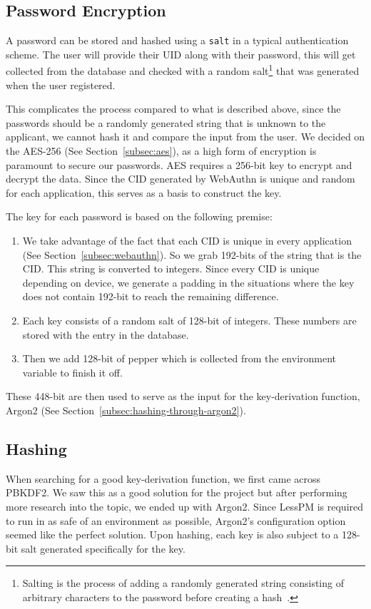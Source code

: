 \subsection{Password Encryption}\label{subsec:password-encryption}
A password can be stored and hashed using a \texttt{salt} in a typical
authentication scheme.
The user will provide their UID along with their password, this will get
collected from the database and checked with a random salt\footnote{
  Salting is the process of adding a randomly generated string consisting of
  arbitrary characters to the password before creating a hash~\cite{
    Kharod2015}.
} that was generated when the user registered.

This complicates the process compared to what is described above, since
the passwords should be a randomly generated string that is unknown to the
applicant, we cannot hash it and compare the input from the user.
We decided on the AES-256 (See Section~\ref{subsec:aes}), as a high form of
encryption is paramount to secure our passwords.
AES requires a 256-bit key to encrypt and decrypt the data.
Since the CID generated by WebAuthn is unique and random for each application,
this serves as a basis to construct the key.

The key for each password is based on the following premise:
\begin{enumerate}
  \item
  We take advantage of the fact that each CID is unique in every
  application (See Section~\ref{subsec:webauthn}). So we grab 192-bits of the
  string that is the CID\@.
  This string is converted to integers.
  Since every CID is unique depending on device, we generate a padding in the
  situations where the key does not contain 192-bit to reach the remaining
  difference.
  \item
  Each key consists of a random salt of 128-bit of integers.
  These numbers are stored with the entry in the database.
  \item
  Then we add 128-bit of pepper which is collected from the environment
  variable to finish it off.
\end{enumerate}
These 448-bit are then used to serve as the input for the key-derivation
function, Argon2 (See Section~\ref{subsec:hashing-through-argon2}).

\subsection{Hashing}\label{subsec:hashing}
When searching for a good key-derivation function, we first came across PBKDF2.
We saw this as a good solution for the project but after performing more
research into the topic, we ended up with Argon2.
Since LessPM is required to run in as safe of an environment as possible,
Argon2's configuration option seemed like the perfect solution.
Upon hashing, each key is also subject to a 128-bit salt generated
specifically for the key.

